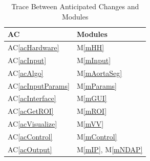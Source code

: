 \documentclass[12pt, titlepage]{article}
\newcommand{\acref}[1]{AC\ref{#1}}
\newcommand{\mref}[1]{M\ref{#1}}
\begin{document}
\begin{table}[H]
\centering
\begin{tabular}{p{} p{}}
\toprule
\textbf{AC} & \textbf{Modules}\\
\midrule
\acref{acHardware} & \mref{mHH}\\
\acref{acInput} & \mref{mInput}\\
\acref{acAlgo} & \mref{mAortaSeg}\\
\acref{acInputParams} & \mref{mParams}\\
\acref{acInterface} & \mref{mGUI}\\
\acref{acGetROI} & \mref{mROI} \\
\acref{acVisualize} & \mref{mVV}\\
\acref{acControl} & \mref{mControl}\\
\acref{acOutput} & \mref{mIP}, \mref{mNDAP} \\
\bottomrule
\end{tabular}
\caption{Trace Between Anticipated Changes and Modules}
\label{TblACT}
\end{table}

\newpage
\end{document}
